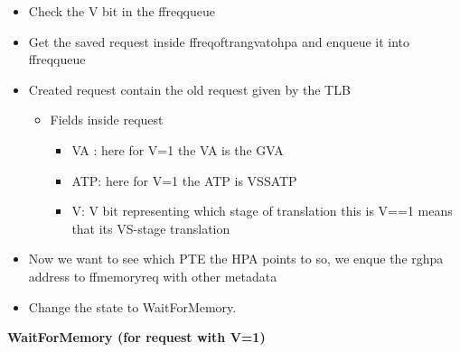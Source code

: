 \documentclass{article}
\newcommand{\resheading}[1]{{\small \colorbox{mygrey}{\begin{minipage}{0.975\textwidth}{\textbf{#1 \vphantom{p\^{E}}}}\end{minipage}}}}
\begin{document}
\begin{itemize}
\item Check the V bit in the ff\textunderscore req\textunderscore queue
\item Get the saved request inside ff\textunderscore req\textunderscore of\textunderscore tran\textunderscore gva\textunderscore to\textunderscore hpa and enqueue it into ff\textunderscore req\textunderscore queue 
\item Created request contain the old request given by the TLB
\begin{itemize}
\item Fields inside request
\begin{itemize}

\item VA : here for V=1 the VA is the GVA
\item ATP: here for V=1 the ATP is VSSATP
\item V: V bit representing which stage of translation this is  V==1 means that its VS-stage translation
\end{itemize}
\end{itemize}

\item Now we want to see which PTE the HPA points to so, we enque the rg\textunderscore hpa  address to ff\textunderscore memory\textunderscore req with other metadata
\item Change the state to WaitForMemory.
\end{itemize}

\resheading{\textbf{WaitForMemory (for request with V=1)}}\\ 
\end{document}
